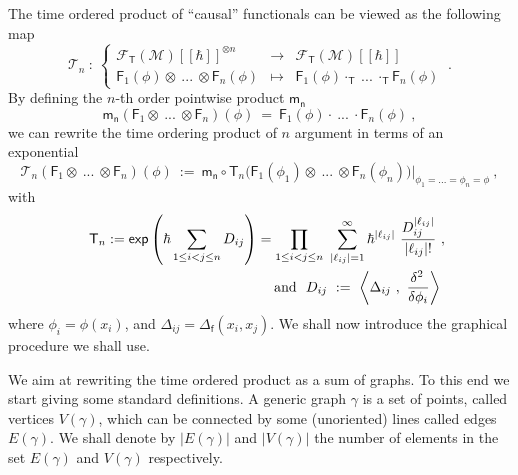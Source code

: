 \documentclass[11pt]{book}
\renewcommand{\exp}{\mathsf{exp}}
\newcommand{\abs}[1]{\left|#1\right|}
\newcommand{\sm}[1]{\left\langle#1\right\rangle}
\newcommand{\Fcal}{\mathcal{F}}
\newcommand{\Mcal}{\mathcal{M}}
\newcommand{\Tcal}{\mathcal{T}}
\newcommand{\Fsf}{\mathsf{F}}
\newcommand{\Tsf}{\mathsf{T}}
\newcommand{\fsf}{\mathsf{f}}
\newcommand{\msf}{\mathsf{m}}
\newcommand{\nsf}{\mathsf{n}}
\theoremstyle{break}
\begin{document}
The  time ordered product of ``causal'' functionals can be viewed  as the following map
%
\begin{equation}
\Tcal_n \ : \ 
\left\{
\begin{array}{lcl}
\Fcal_\Tsf(\Mcal)[[\hbar]]^{\otimes n} & \to & \Fcal_\Tsf(\Mcal)[[\hbar]] \\
\Fsf_1(\phi) \otimes \ ... \ \otimes \Fsf_n(\phi) & \mapsto & \Fsf_1(\phi) \cdot_{\Tsf} \ ... \ \cdot_{\Tsf} \Fsf_n(\phi)
\end{array}
\right. \ .
\label{eq:time_ordered_op}
\end{equation}
% 
By defining the $n$-th order pointwise product $\msf_\nsf$
%
\begin{equation*}
\msf_\nsf \left( \Fsf_1 \otimes \ ... \ \otimes \Fsf_n \right)(\phi) \ = \ \Fsf_1(\phi) \cdot \ ... \ \cdot \Fsf_n(\phi) \ ,
\end{equation*}
%
we can rewrite the time ordering product of $n$ argument in terms of an exponential
%
\begin{equation*}
\Tcal_n (\Fsf_1 \otimes \ ... \ \otimes \Fsf_n)(\phi) \ := \ \msf_\nsf \circ \Tsf_n \bigg( \Fsf_1(\phi_1) \otimes \ ... \ \otimes \Fsf_n(\phi_n) \bigg) \bigg|_{\phi_1 = ... = \phi_n = \phi} \ ,
\end{equation*}
%
with 
%
\begin{eqnarray*}
&&\Tsf_n := \exp\left(\hbar \sum_{1 \leq i < j \leq n} D_{ij}\right) =
\prod_{1 \leq i < j \leq n} \ \sum_{\abs{\ell_{ij}}=1}^\infty \hbar^{\abs{\ell_{ij}}} \ \frac{D_{ij}^{\abs{\ell_{ij}}}}{\abs{\ell_{ij}} !} \ , \\
&& \mbox{ and } \ D_{ij} \ := \ \sm{\Delta_{ij} \ , \ \frac{\delta^2 \hfil}{\delta \phi_i} } \ 
\end{eqnarray*}
%
where $\phi_i = \phi(x_i)$, and $\Delta_{ij}=\Delta_\fsf(x_i,x_j)$. We shall now introduce the graphical procedure we shall use. 


\bigskip


We aim at rewriting the time ordered product as a sum of graphs. To this end we start giving some standard definitions. A generic graph $\gamma$ is a set of points, called vertices $V(\gamma)$, which can be connected by some (unoriented) lines called edges $E(\gamma)$. We shall denote by $\abs{E(\gamma)}$ and $\abs{V(\gamma)}$ the number of elements in the set $E(\gamma)$ and $V(\gamma)$ respectively. 
\end{document}
